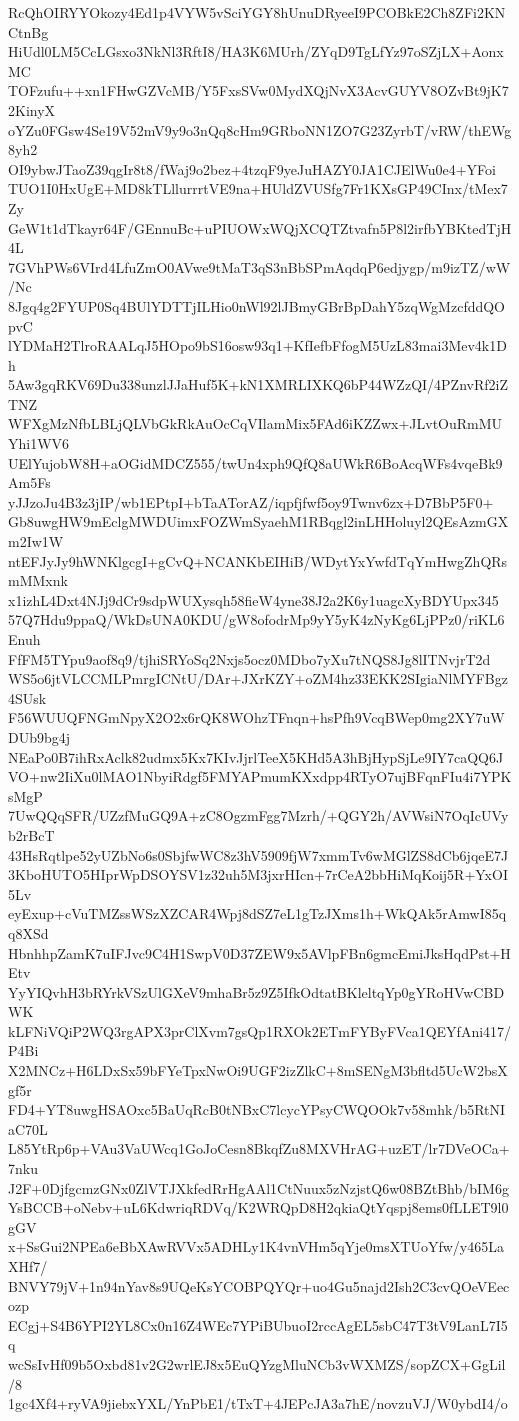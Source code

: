 RcQhOIRYYOkozy4Ed1p4VYW5vSciYGY8hUnuDRyeeI9PCOBkE2Ch8ZFi2KNCtnBg
HiUdl0LM5CcLGsxo3NkNl3RftI8/HA3K6MUrh/ZYqD9TgLfYz97oSZjLX+AonxMC
TOFzufu++xn1FHwGZVcMB/Y5FxsSVw0MydXQjNvX3AcvGUYV8OZvBt9jK72KinyX
oYZu0FGsw4Se19V52mV9y9o3nQq8cHm9GRboNN1ZO7G23ZyrbT/vRW/thEWg8yh2
OI9ybwJTaoZ39qgIr8t8/fWaj9o2bez+4tzqF9yeJuHAZY0JA1CJElWu0e4+YFoi
TUO1I0HxUgE+MD8kTLllurrrtVE9na+HUldZVUSfg7Fr1KXsGP49CInx/tMex7Zy
GeW1t1dTkayr64F/GEnnuBc+uPIUOWxWQjXCQTZtvafn5P8l2irfbYBKtedTjH4L
7GVhPWs6VIrd4LfuZmO0AVwe9tMaT3qS3nBbSPmAqdqP6edjygp/m9izTZ/wW/Nc
8Jgq4g2FYUP0Sq4BUlYDTTjILHio0nWl92lJBmyGBrBpDahY5zqWgMzcfddQOpvC
lYDMaH2TlroRAALqJ5HOpo9bS16osw93q1+KfIefbFfogM5UzL83mai3Mev4k1Dh
5Aw3gqRKV69Du338unzlJJaHuf5K+kN1XMRLIXKQ6bP44WZzQI/4PZnvRf2iZTNZ
WFXgMzNfbLBLjQLVbGkRkAuOcCqVIlamMix5FAd6iKZZwx+JLvtOuRmMUYhi1WV6
UElYujobW8H+aOGidMDCZ555/twUn4xph9QfQ8aUWkR6BoAcqWFs4vqeBk9Am5Fs
yJJzoJu4B3z3jIP/wb1EPtpI+bTaATorAZ/iqpfjfwf5oy9Twnv6zx+D7BbP5F0+
Gb8uwgHW9mEclgMWDUimxFOZWmSyaehM1RBqgl2inLHHoluyl2QEsAzmGXm2Iw1W
ntEFJyJy9hWNKlgcgI+gCvQ+NCANKbEIHiB/WDytYxYwfdTqYmHwgZhQRsmMMxnk
x1izhL4Dxt4NJj9dCr9sdpWUXysqh58fieW4yne38J2a2K6y1uagcXyBDYUpx345
57Q7Hdu9ppaQ/WkDsUNA0KDU/gW8ofodrMp9yY5yK4zNyKg6LjPPz0/riKL6Enuh
FfFM5TYpu9aof8q9/tjhiSRYoSq2Nxjs5ocz0MDbo7yXu7tNQS8Jg8lITNvjrT2d
WS5o6jtVLCCMLPmrgICNtU/DAr+JXrKZY+oZM4hz33EKK2SIgiaNlMYFBgz4SUsk
F56WUUQFNGmNpyX2O2x6rQK8WOhzTFnqn+hsPfh9VcqBWep0mg2XY7uWDUb9bg4j
NEaPo0B7ihRxAclk82udmx5Kx7KIvJjrlTeeX5KHd5A3hBjHypSjLe9IY7caQQ6J
VO+nw2IiXu0lMAO1NbyiRdgf5FMYAPmumKXxdpp4RTyO7ujBFqnFIu4i7YPKsMgP
7UwQQqSFR/UZzfMuGQ9A+zC8OgzmFgg7Mzrh/+QGY2h/AVWsiN7OqIcUVyb2rBcT
43HsRqtlpe52yUZbNo6s0SbjfwWC8z3hV5909fjW7xmmTv6wMGlZS8dCb6jqeE7J
3KboHUTO5HIprWpDSOYSV1z32uh5M3jxrHIcn+7rCeA2bbHiMqKoij5R+YxOI5Lv
eyExup+cVuTMZssWSzXZCAR4Wpj8dSZ7eL1gTzJXms1h+WkQAk5rAmwI85qq8XSd
HbnhhpZamK7uIFJvc9C4H1SwpV0D37ZEW9x5AVlpFBn6gmcEmiJksHqdPst+HEtv
YyYIQvhH3bRYrkVSzUlGXeV9mhaBr5z9Z5IfkOdtatBKleltqYp0gYRoHVwCBDWK
kLFNiVQiP2WQ3rgAPX3prClXvm7gsQp1RXOk2ETmFYByFVca1QEYfAni417/P4Bi
X2MNCz+H6LDxSx59bFYeTpxNwOi9UGF2izZlkC+8mSENgM3bfltd5UcW2bsXgf5r
FD4+YT8uwgHSAOxc5BaUqRcB0tNBxC7lcycYPsyCWQOOk7v58mhk/b5RtNIaC70L
L85YtRp6p+VAu3VaUWcq1GoJoCesn8BkqfZu8MXVHrAG+uzET/lr7DVeOCa+7nku
J2F+0DjfgcmzGNx0ZlVTJXkfedRrHgAAl1CtNuux5zNzjstQ6w08BZtBhb/bIM6g
YsBCCB+oNebv+uL6KdwriqRDVq/K2WRQpD8H2qkiaQtYqspj8ems0fLLET9l0gGV
x+SsGui2NPEa6eBbXAwRVVx5ADHLy1K4vnVHm5qYje0msXTUoYfw/y465LaXHf7/
BNVY79jV+1n94nYav8s9UQeKsYCOBPQYQr+uo4Gu5najd2Ish2C3cvQOeVEecozp
ECgj+S4B6YPI2YL8Cx0n16Z4WEc7YPiBUbuoI2rccAgEL5sbC47T3tV9LanL7I5q
wcSsIvHf09b5Oxbd81v2G2wrlEJ8x5EuQYzgMluNCb3vWXMZS/sopZCX+GgLil/8
1gc4Xf4+ryVA9jiebxYXL/YnPbE1/tTxT+4JEPcJA3a7hE/novzuVJ/W0ybdI4/o
